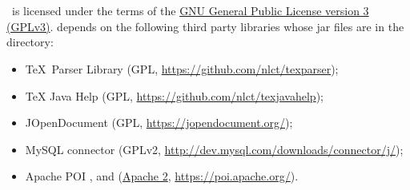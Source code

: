 \chapter{}
\label{sec:licence}

   \appname\ is licensed under the terms of the 
   \href{https://www.gnu.org/licenses/gpl-3.0.html}{GNU General
   Public License version 3 (GPLv3)}.
    depends on the following third party libraries whose jar files are
   in the  directory:
   \begin{itemize}
   \item \TeX\ Parser Library 
   (GPL, \url{https://github.com/nlct/texparser});
   \item TeX Java Help 
   (GPL, \url{https://github.com/nlct/texjavahelp});
   \item JOpenDocument 
     (GPL, \url{https://jopendocument.org/});
   \item MySQL connector 
     (GPLv2, \url{http://dev.mysql.com/downloads/connector/j/});
   \item Apache POI , 
   and 
    (\href{https://www.apache.org/licenses/LICENSE-2.0.html}{Apache 2}, \url{https://poi.apache.org/}).
   \end{itemize}



\printmain
\printindex


